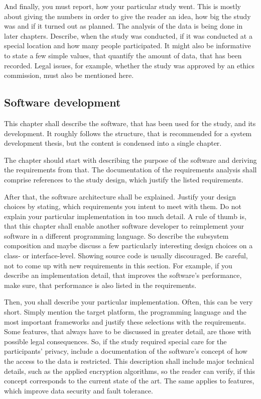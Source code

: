 And finally, you must report, how your particular study went.
This is mostly about giving the numbers in order to give the reader an idea, how big the study was and if it turned out as planned.
The analysis of the data is being done in later chapters.
Describe, when the study was conducted, if it was conducted at a special location and how many people participated.
It might also be informative to state a few simple values, that quantify the amount of data, that has been recorded.
Legal issues, for example, whether the study was approved by an ethics commission, must also be mentioned here.

\subsection{Software development}
This chapter shall describe the software, that has been used for the study, and its development.
It roughly follows the structure, that is recommended for a system development thesis, but the content is condensed into a single chapter.

The chapter should start with describing the purpose of the software and deriving the requirements from that.
The documentation of the requirements analysis shall comprise references to the study design, which justify the listed requirements.

After that, the software architecture shall be explained.
Justify your design choices by stating, which requirements you intent to meet with them.
Do not explain your particular implementation in too much detail.
A rule of thumb is, that this chapter shall enable another software developer to reimplement your software in a different programming language.
So describe the subsystem composition and maybe discuss a few particularly interesting design choices on a class- or interface-level.
Showing source code is usually discouraged.
Be careful, not to come up with new requirements in this section.
For example, if you describe an implementation detail, that improves the software's performance, make sure, that performance is also listed in the requirements.

Then, you shall describe your particular implementation.
Often, this can be very short.
Simply mention the target platform, the programming language and the most important frameworks and justify these selections with the requirements.
Some features, that always have to be discussed in greater detail, are those with possible legal consequences.
So, if the study required special care for the participants' privacy, include a documentation of the software's concept of how the access to the data is restricted.
This description shall include major technical details, such as the applied encryption algorithms, so the reader can verify, if this concept corresponds to the current state of the art.
The same applies to features, which improve data security and fault tolerance.

